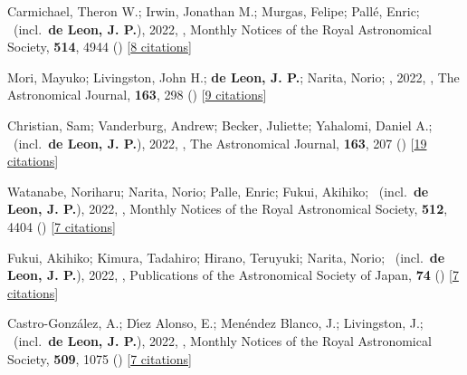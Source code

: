 \item[{\color{numcolor}\scriptsize48}] Carmichael, Theron W.; Irwin, Jonathan M.; Murgas, Felipe; Pall{\'e}, Enric; \etal\ (incl.\ \textbf{de Leon, J. P.}), 2022, , Monthly Notices of the Royal Astronomical Society, \textbf{514}, 4944 () [\href{https://ui.adsabs.harvard.edu/abs/2022MNRAS.514.4944C}{8 citations}]

\item[{\color{numcolor}\scriptsize47}] Mori, Mayuko; Livingston, John H.; \textbf{de Leon, J. P.}; Narita, Norio; \etal, 2022, , The Astronomical Journal, \textbf{163}, 298 () [\href{https://ui.adsabs.harvard.edu/abs/2022AJ....163..298M}{9 citations}]

\item[{\color{numcolor}\scriptsize46}] Christian, Sam; Vanderburg, Andrew; Becker, Juliette; Yahalomi, Daniel A.; \etal\ (incl.\ \textbf{de Leon, J. P.}), 2022, , The Astronomical Journal, \textbf{163}, 207 () [\href{https://ui.adsabs.harvard.edu/abs/2022AJ....163..207C}{19 citations}]

\item[{\color{numcolor}\scriptsize45}] Watanabe, Noriharu; Narita, Norio; Palle, Enric; Fukui, Akihiko; \etal\ (incl.\ \textbf{de Leon, J. P.}), 2022, , Monthly Notices of the Royal Astronomical Society, \textbf{512}, 4404 () [\href{https://ui.adsabs.harvard.edu/abs/2022MNRAS.512.4404W}{7 citations}]

\item[{\color{numcolor}\scriptsize44}] Fukui, Akihiko; Kimura, Tadahiro; Hirano, Teruyuki; Narita, Norio; \etal\ (incl.\ \textbf{de Leon, J. P.}), 2022, , Publications of the Astronomical Society of Japan, \textbf{74} () [\href{https://ui.adsabs.harvard.edu/abs/2022PASJ...74L...1F}{7 citations}]

\item[{\color{numcolor}\scriptsize43}] Castro-Gonz{\'a}lez, A.; D{\'\i}ez Alonso, E.; Men{\'e}ndez Blanco, J.; Livingston, J.; \etal\ (incl.\ \textbf{de Leon, J. P.}), 2022, , Monthly Notices of the Royal Astronomical Society, \textbf{509}, 1075 () [\href{https://ui.adsabs.harvard.edu/abs/2022MNRAS.509.1075C}{7 citations}]

